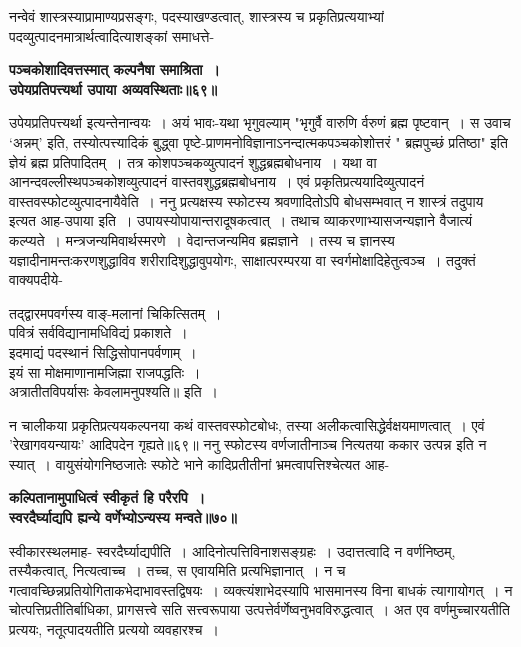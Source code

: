 {{{{नन्वेवं शास्त्रस्याप्रामाण्यप्रसङ्गः, पदस्याखण्डत्वात्, शास्त्रस्य च प्रकृतिप्रत्ययाभ्यां पदव्युत्पादनमात्रार्थत्वादित्याशङ्कां समाधत्ते-
\begin{center}{\bfseries पञ्चकोशादिवत्तस्मात् कल्पनैषा समाश्रिता~।\\
उपेयप्रतिपत्त्यर्था उपाया अव्यवस्थिताः॥६९॥}\end{center}
उपेयप्रतिपत्त्यर्था इत्यन्तेनान्वयः~।
अयं भावः-यथा भृगुवल्याम् "भृगुर्वै वारुणि र्वरुणं ब्रह्म पृष्टवान्~।
स उवाच `अन्नम्' इति, तस्योत्पत्त्यादिकं बुद्ध्वा पृष्टे-प्राणमनोविज्ञानाऽनन्दात्मकपञ्चकोशोत्तरं " ब्रह्मपुच्छं प्रतिष्ठा" इति ज्ञेयं ब्रह्म प्रतिपादितम्~।
तत्र कोशपञ्चकव्युत्पादनं शुद्धब्रह्मबोधनाय~।
यथा वा आनन्दवल्लीस्थपञ्चकोशव्युत्पादनं वास्तवशुद्धब्रह्मबोधनाय~।
एवं प्रकृतिप्रत्ययादिव्युत्पादनं वास्तवस्फोटव्युत्पादनायैवेति~।
ननु प्रत्यक्षस्य स्फोटस्य श्रवणादितोऽपि बोधसम्भवात् न शास्त्रं तदुपाय इत्यत आह-उपाया इति~।
उपायस्योपायान्तरादूषकत्वात्~।
तथाच व्याकरणाभ्यासजन्यज्ञाने वैजात्यं कल्प्यते~।
मन्त्रजन्यमिवार्थस्मरणे~।
वेदान्तजन्यमिव ब्रह्मज्ञाने~।
तस्य च ज्ञानस्य यज्ञादीनामन्तःकरणशुद्धाविव शरीरादिशुद्धावुपयोगः, साक्षात्परम्परया वा स्वर्गमोक्षादिहेतुत्वञ्च~।
तदुक्तं वाक्यपदीये-
\begin{center}तद्द्वारमपवर्गस्य वाङ्-मलानां चिकित्सितम्~।\\
पवित्रं सर्वविद्यानामधिविद्यं प्रकाशते~।\\[10pt]
इदमाद्यं पदस्थानं सिद्धिसोपानपर्वणाम्~।\\
इयं सा मोक्षमाणानामजिह्मा राजपद्धतिः~।\\[10pt]
अत्रातीतविपर्यासः केवलामनुपश्यति॥ इति~।\end{center}
न चालीकया प्रकृतिप्रत्ययकल्पनया कथं वास्तवस्फोटबोधः, तस्या अलीकत्वासिद्धेर्वक्षयमाणत्वात्~।
एवं 'रेखागवयन्यायः' आदिपदेन गृह्यते॥६९॥
 ननु स्फोटस्य वर्णजातीनाञ्च नित्यतया ककार उत्पन्न इति न स्यात्~।
वायुसंयोगनिष्ठजातेः स्फोटे भाने कादिप्रतीतीनां भ्रमत्वापत्तिश्चेत्यत आह-
\begin{center}{\bfseries कल्पितानामुपाधित्वं स्वीकृतं हि परैरपि~।\\
स्वरदैर्घ्याद्यपि ह्यन्ये वर्णेभ्योऽन्यस्य मन्वते॥७०॥}\end{center}
 स्वीकारस्थलमाह- स्वरदैर्घ्याद्यपीति~।
आदिनोत्पत्तिविनाशसङ्ग्रहः~।
उदात्तत्वादि न वर्णनिष्ठम्, तस्यैकत्वात्, नित्यत्वाच्च~।
तच्च, स एवायमिति प्रत्यभिज्ञानात्~।
न च गत्वावच्छिन्नप्रतियोगिताकभेदाभावस्तद्विषयः~।
व्यक्त्यंशाभेदस्यापि भासमानस्य विना बाधकं त्यागायोगत्~।
न चोत्पत्तिप्रतीतिर्बाधिका, प्रागसत्त्वे सति सत्त्वरूपाया उत्पत्तेर्वर्णेष्वनुभवविरुद्धत्वात्~।
अत एव वर्णमुच्चारयतीति प्रत्ययः, नतूत्पादयतीति प्रत्ययो व्यवहारश्च~।
}}}}
